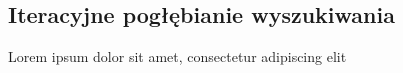 \subsection{Iteracyjne pogłębianie wyszukiwania}
\label{subsec:iteracyjne-pogebianie-wyszukiwania}

Lorem ipsum dolor sit amet, consectetur adipiscing elit